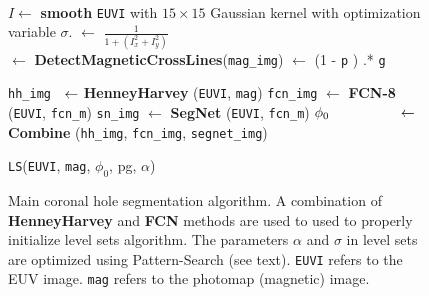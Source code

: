 \begin{figure}
  \begin{algorithmic}[0]
    \State {}
    \State {}\\
    \State $I \gets$ \textbf{smooth} {\tt EUVI} with $15\times 15$ Gaussian kernel
    \State \hspace{1.9cm} with optimization variable $\sigma$.
       $\gets$ $\frac{1}{1+(I_x^2+I_y^2)}$ 
    ~\\
    \State{} 
       \hspace{2mm}$\gets$ \textbf{DetectMagneticCrossLines}({\tt mag\_img})
     $\gets$ (1 - {\tt p} ) .* {\tt g} 
    ~\\
    {\color{blue}
    
    \State{}
    \State {}
    \State \texttt{hh\_img} \hspace{0.6cm}$\hspace{2mm}\gets$ \textbf{HenneyHarvey} ({\tt EUVI}, {\tt mag})
    \State \texttt{fcn\_img} \hspace{0.6cm}$\gets$ \textbf{FCN-8} ({\tt EUVI}, {\tt fcn\_m})
    \State \texttt{sn\_img} \hspace{0.78cm}$\gets$ \textbf{SegNet} ({\tt EUVI}, {\tt fcn\_m})
    \State $\phi_0 \hspace{1.7cm}\gets$ \textbf{Combine} (\texttt{hh\_img}, \texttt{fcn\_img},
			\State \hspace{4.2cm}\texttt{segnet\_img})\\
	}
    \State {}
    \State {}
     {\tt LS}({\tt EUVI}, {\tt mag}, $\phi_0$, pg, $\alpha$)
    \EndFunction
  \end{algorithmic}
  \caption{Main coronal hole segmentation algorithm. {\color{blue} A combination of
  		\textbf{HenneyHarvey} \cite{Jatla2014, Henney2005} and \textbf{FCN} methods are used
  		to used to properly initialize level sets algorithm.}
    The parameters $\alpha$ and $\sigma$ {\color{blue} in level sets }are optimized using Pattern-Search
           (see text).
    {\tt EUVI} refers to the EUV image.
    {\tt mag}   refers to the photomap (magnetic) image.
  }\label{fig:mainAlgo}
\end{figure}